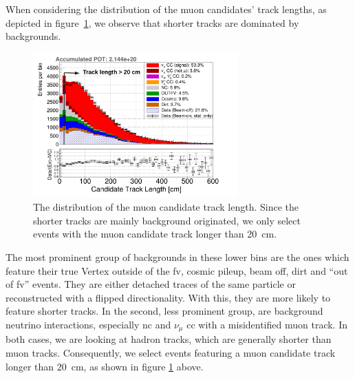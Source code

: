 When considering the distribution of the muon candidates' track lengths, as depicted in figure~\ref{fig:track_length_20_6}, we observe that shorter tracks are dominated by backgrounds.
\begin{figure}[htbp]
  \centering
  \includegraphics[width=0.7\textwidth]{images/NewCCInclusive/selection/Track_length_20_6.pdf}
  \caption[Muon Candidate Track Length Cut]{The distribution of the muon candidate track length. Since the shorter tracks are mainly background originated, we only select events with the muon candidate track longer than \SI{20}{\cm}.}
  \label{fig:track_length_20_6}
\end{figure} 
The most prominent group of backgrounds in these lower bins are the ones which feature their true \gls{Vertex} outside of the \gls{fv}, \ie cosmic pileup, beam off, dirt and ``out of \gls{fv}'' events. They are either detached traces of the same particle or reconstructed with a flipped directionality. With this, they are more likely to feature shorter tracks. In the second, less prominent group, are background neutrino interactions, especially \gls{nc} and $\nu_{\mu}$ \gls{cc} with a misidentified muon track. In both cases, we are looking at hadron tracks, which are generally shorter than muon tracks. Consequently, we select events featuring a muon candidate track longer than \SI{20}{\cm}, as shown in figure \ref{fig:track_length_20_6} above.

